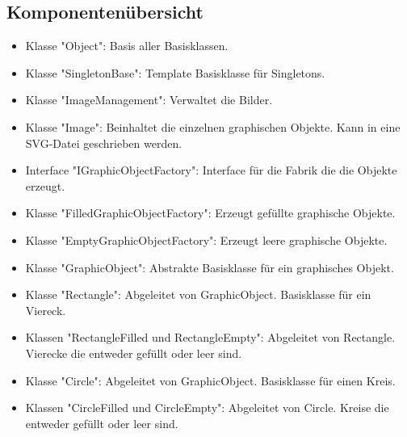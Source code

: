 \documentclass[12pt,a4paper]{article}
\begin{document}
\subsection {Komponentenübersicht}
\begin {itemize} 
	\item Klasse "Object":
	\newline
	Basis aller Basisklassen.
	
	\item Klasse "SingletonBase":
	\newline
	Template Basisklasse für Singletons.
	
	\item Klasse "ImageManagement":
	\newline
	Verwaltet die Bilder.
	
	\item Klasse "Image":
	\newline	
	Beinhaltet die einzelnen graphischen Objekte. Kann in eine SVG-Datei geschrieben werden.
	
	\item Interface "IGraphicObjectFactory":
	\newline
	Interface für die Fabrik die die Objekte erzeugt.
	
	\item Klasse "FilledGraphicObjectFactory":
	\newline
	Erzeugt gefüllte graphische Objekte.
	
	\item Klasse "EmptyGraphicObjectFactory":
	\newline
	Erzeugt leere graphische Objekte.
	
	\item Klasse "GraphicObject":
	\newline
	Abstrakte Basisklasse für ein graphisches Objekt.
	
	\item Klasse "Rectangle":
	\newline
	Abgeleitet von GraphicObject. Basisklasse für ein Viereck.

	\item Klassen "RectangleFilled und RectangleEmpty":
	\newline
	Abgeleitet von Rectangle. Vierecke die entweder gefüllt oder leer sind.

	\item Klasse "Circle":
	\newline
	Abgeleitet von GraphicObject. Basisklasse für einen Kreis.

	\item Klassen "CircleFilled und CircleEmpty":
	\newline
	Abgeleitet von Circle. Kreise die entweder gefüllt oder leer sind.
	
	
\end {itemize}
\end{document}
